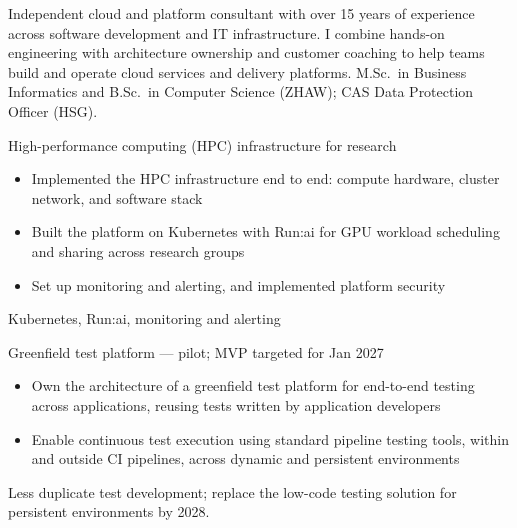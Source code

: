 \documentclass[10pt,a4paper]{altacv}
\begin{document}
\begin{fullwidth}
\makecvheader
Independent cloud and platform consultant with over 15 years of experience across software development and IT infrastructure.
I combine hands-on engineering with architecture ownership and customer coaching to help teams build and operate cloud services and delivery platforms.
M.Sc.\ in Business Informatics and B.Sc.\ in Computer Science (ZHAW); CAS Data Protection Officer (HSG).
\par\medskip
\end{fullwidth}


 High-performance computing (HPC) infrastructure for research

\begin{itemize}
\item Implemented the HPC infrastructure end to end: compute hardware, cluster network, and software stack
\item Built the platform on Kubernetes with Run:ai for GPU workload scheduling and sharing across research groups
\item Set up monitoring and alerting, and implemented platform security
\end{itemize}

Kubernetes, Run:ai, monitoring and alerting

\divider

 Greenfield test platform --- pilot; MVP targeted for Jan 2027\par

\begin{itemize}
\item Own the architecture of a greenfield test platform for end-to-end testing across applications, reusing tests written by application developers
\item Enable continuous test execution using standard pipeline testing tools, within and outside CI pipelines, across dynamic and persistent environments
\end{itemize}

Less duplicate test development; replace the low-code testing solution for persistent environments by 2028.\par\smallskip
\end{document}
